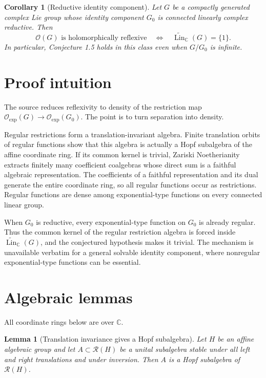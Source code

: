 \documentclass[11pt]{article}
\newtheorem{lemma}[theorem]{Lemma}
\newtheorem{corollary}[theorem]{Corollary}
\newcommand{\Oexp}{\mathcal O_{\mathrm{exp}}}
\newcommand{\Reg}{\mathcal R}
\newcommand{\LinB}{\widetilde{\operatorname{Lin}}_{\mathbb C}}
\begin{document}
\begin{corollary}[Reductive identity component]\label{cor:main}
Let $G$ be a compactly generated complex Lie group whose identity component
$G_0$ is connected linearly complex reductive.  Then
\[
 \mathcal O(G)\text{ is holomorphically reflexive}
 \quad\Longleftrightarrow\quad
 \LinB(G)=\{1\}.
\]
In particular, Conjecture 1.5 holds in this class even when $G/G_0$ is
infinite.
\end{corollary}

\section{Proof intuition}

The source reduces reflexivity to density of the restriction map
$\Oexp(G)\to\Oexp(G_0)$.  The point is to turn separation into density.

Regular restrictions form a translation-invariant algebra.  Finite
translation orbits of regular functions show that this algebra is actually a
Hopf subalgebra of the affine coordinate ring.  If its common kernel is
trivial, Zariski Noetherianity extracts finitely many coefficient coalgebras
whose direct sum is a faithful algebraic representation.  The coefficients
of a faithful representation and its dual generate the entire coordinate
ring, so all regular functions occur as restrictions.  Regular functions are
dense among exponential-type functions on every connected linear group.

When $G_0$ is reductive, every exponential-type function on $G_0$ is already
regular.  Thus the common kernel of the regular restriction algebra is forced
inside $\LinB(G)$, and the conjectured hypothesis makes it trivial.  The
mechanism is unavailable verbatim for a general solvable identity component,
where nonregular exponential-type functions can be essential.

\section{Algebraic lemmas}

All coordinate rings below are over $\mathbb C$.

\begin{lemma}[Translation invariance gives a Hopf subalgebra]
\label{lem:hopf}
Let $H$ be an affine algebraic group and let $A\subset\Reg(H)$ be a unital
subalgebra stable under all left and right translations and under inversion.
Then $A$ is a Hopf subalgebra of $\Reg(H)$.
\end{lemma}
\end{document}

